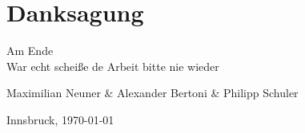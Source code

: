 \section*{Danksagung}

Am Ende \\
War echt scheiße de Arbeit bitte nie wieder
\vspace{1cm}

Maximilian Neuner \& Alexander Bertoni \& Philipp Schuler

Innsbruck, \today

\newpage